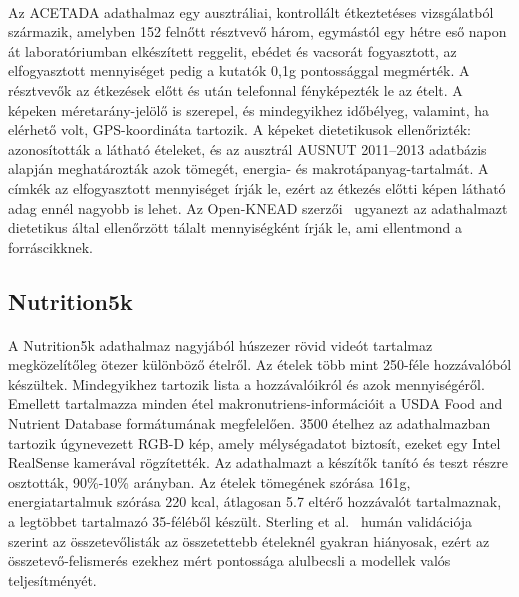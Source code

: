 \paragraph{}Az ACETADA adathalmaz \cite{coburn2025acetada} egy ausztráliai, kontrollált étkeztetéses vizsgálatból származik, amelyben 152 felnőtt résztvevő három, egymástól egy hétre eső napon át laboratóriumban elkészített reggelit, ebédet és vacsorát fogyasztott, az elfogyasztott mennyiséget pedig a kutatók 0,1g pontossággal megmérték. A résztvevők az étkezések előtt és után telefonnal fényképezték le az ételt. A képeken méretarány-jelölő is szerepel, és mindegyikhez időbélyeg, valamint, ha elérhető volt, GPS-koordináta tartozik. A képeket dietetikusok ellenőrizték: azonosították a látható ételeket, és az ausztrál AUSNUT 2011--2013 adatbázis alapján meghatározták azok tömegét, energia- és makrotápanyag-tartalmát. A címkék az elfogyasztott mennyiséget írják le, ezért az étkezés előtti képen látható adag ennél nagyobb is lehet. Az Open-KNEAD szerzői~\cite{coburn2026openknead} ugyanezt az adathalmazt dietetikus által ellenőrzött tálalt mennyiségként írják le, ami ellentmond a forráscikknek.

\subsection{Nutrition5k}
\paragraph{}A Nutrition5k \cite{thames_nutrition5k_2021} adathalmaz nagyjából húszezer rövid videót tartalmaz megközelítőleg ötezer különböző ételről. Az ételek több mint 250-féle hozzávalóból készültek. Mindegyikhez tartozik lista a hozzávalóikról és azok mennyiségéről. Emellett tartalmazza minden étel makronutriens-információit a USDA Food and Nutrient Database \cite{usda_fndds_2010} formátumának megfelelően. 3500 ételhez az adathalmazban tartozik úgynevezett RGB-D kép, amely mélységadatot biztosít, ezeket egy Intel RealSense kamerával rögzítették. Az adathalmazt a készítők tanító és teszt részre osztották, 90\%-10\% arányban.
Az ételek tömegének szórása 161g, energiatartalmuk szórása 220 kcal, átlagosan 5.7 eltérő hozzávalót tartalmaznak, a legtöbbet tartalmazó 35-féléből készült.
Sterling et al.~\cite{sterling2026vlm} humán validációja szerint az összetevőlisták az összetettebb ételeknél gyakran hiányosak, ezért az összetevő-felismerés ezekhez mért pontossága alulbecsli a modellek valós teljesítményét.

